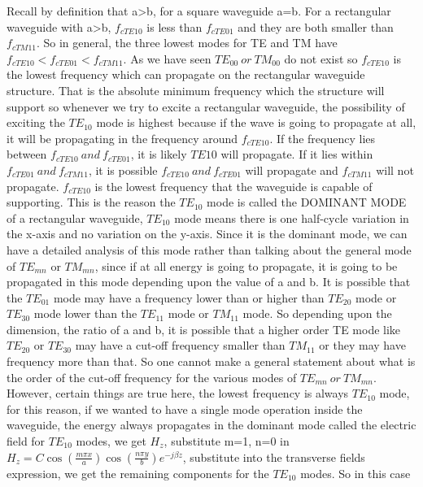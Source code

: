Recall by definition that a>b, for a square waveguide a=b. For a rectangular waveguide with a>b, $f_{cTE{10}}$ is less than $f_{cTE{01}}$ and they are both smaller than $f_{cTM{11}}$. So in general, the three lowest modes for TE and TM have $f_{cTE{10}}<f_{cTE{01}}<f_{cTM{11}}$. As we have seen $TE_{00}\ or\ TM_{00}$ do not exist so $f_{cTE{10}}$ is the lowest frequency which can propagate on the rectangular waveguide structure. That is the absolute minimum frequency which the structure will support so whenever we try to excite a rectangular waveguide, the possibility of exciting the $TE_{10}$ mode is highest because if the wave is going to propagate at all, it will be propagating in the frequency around $f_{cTE{10}}$. If the frequency lies between $f_{cTE{10}}\ and\ f_{cTE{01}}$, it is likely $TE{10}$ will propagate. If it lies within $f_{cTE{01}}\ and\ f_{cTM{11}}$, it is possible $f_{cTE{10}}\ and\ f_{cTE{01}}$ will propagate and $f_{cTM{11}}$ will not propagate. $f_{cTE{10}}$ is the lowest frequency that the waveguide is capable of supporting. This is the reason the $TE_{10}$ mode is called the DOMINANT MODE of a rectangular waveguide, $TE_{10}$ mode means there is one half-cycle variation in the x-axis and no variation on the y-axis. Since it is the dominant mode, we can have a detailed analysis of this mode rather than talking about the general mode of $TE_{mn}$ or $TM_{mn}$, since if at all energy is going to propagate, it is going to be propagated in this mode depending upon the value of a and b. It is possible that the $TE_{01}$ mode may have a frequency lower than or higher than $TE_{20}$ mode or $TE_{30}$ mode lower than the $TE_{11}$ mode or $TM_{11}$ mode. So depending upon the dimension, the ratio of a and b, it is possible that a higher order TE mode like $TE_{20}$ or $TE_{30}$ may have a cut-off frequency smaller than $TM_{11}$ or they may have frequency more than that. So one cannot make a general statement about what is the order of the cut-off frequency for the various modes of $TE_{mn}\ or\ TM_{mn}$. However, certain things are true here, the lowest frequency is always $TE_{10}$ mode, for this reason, if we wanted to have a single mode operation inside the waveguide, the energy always propagates in the dominant mode called the electric field for $TE_{10}$ modes, we get $H_z$, substitute m=1, n=0 in $H_z = C \cos (\frac{m\pi x}{a})\cos(\frac{n\pi y}{b})e^{-j\beta z}$, substitute into the transverse fields expression, we get the remaining components for the $TE_{10}$ modes. So in this case
